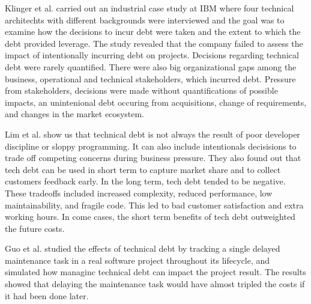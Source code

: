
Klinger et al.\cite{p35-klinger} carried out an industrial case study at IBM where four technical architechts with different backgrounds were interviewed and the goal was to examine how the decisions to incur debt were taken and the extent to which the debt provided leverage\cite{p35-klinger}. The study revealed that the company failed to assess the impact of intentionally incurring debt on projects. Decisions regarding technical debt were rarely quantified. There were also big organizational gaps among the business, operational and technical stakeholders, which incurred debt. Pressure from stakeholders, decisions were made without quantifications of possible impacts, an unintenional debt occuring from acquisitions, change of requirements, and changes in the market ecosystem.

Lim et al.\cite{lim-taksande} show us that technical debt is not always the result of poor developer discipline or sloppy programming. It can also include intentionals decisisions to trade off competing concerns during business pressure. They also found out that tech debt can be used in short term to capture market share and to collect customers feedback early. In the long term, tech debt tended to be negative. These tradeoffs included increased complexity, reduced performance, low maintainability, and fragile code. This led to bad customer satisfaction and extra working hours. In come cases, the short term benefits of tech debt outweighted the future costs.

Guo et al.\cite{guo2011tracking} studied the effects of technical debt by tracking a single delayed maintenance task in a real software project throughout its lifecycle, and simulated how managinc technical debt can impact the project result. The results showed that delaying the maintenance task would have almost tripled the costs if it had been done later.

